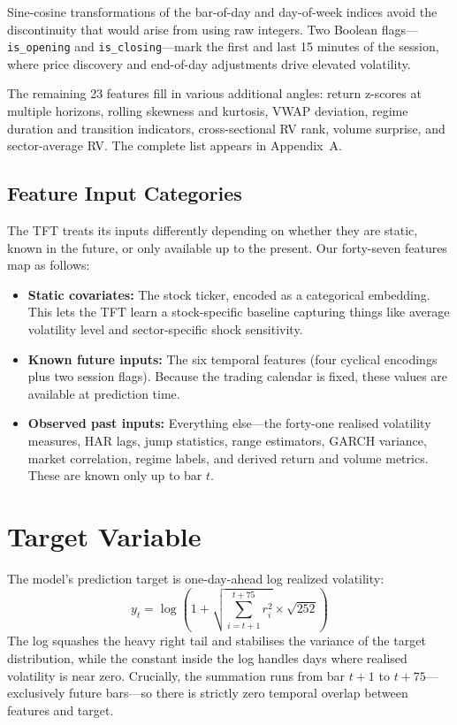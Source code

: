 Sine-cosine transformations of the bar-of-day and day-of-week indices avoid the discontinuity that would arise from using raw integers. Two Boolean flags---\texttt{is\_opening} and \texttt{is\_closing}---mark the first and last 15 minutes of the session, where price discovery and end-of-day adjustments drive elevated volatility.

The remaining 23 features fill in various additional angles: return z-scores at multiple horizons, rolling skewness and kurtosis, VWAP deviation, regime duration and transition indicators, cross-sectional RV rank, volume surprise, and sector-average RV. The complete list appears in Appendix~A.

\subsection{Feature Input Categories}

The TFT treats its inputs differently depending on whether they are static, known in the future, or only available up to the present. Our forty-seven features map as follows:
\begin{itemize}
\item \textbf{Static covariates:} The stock ticker, encoded as a categorical embedding. This lets the TFT learn a stock-specific baseline capturing things like average volatility level and sector-specific shock sensitivity.
\item \textbf{Known future inputs:} The six temporal features (four cyclical encodings plus two session flags). Because the trading calendar is fixed, these values are available at prediction time.
\item \textbf{Observed past inputs:} Everything else---the forty-one realised volatility measures, HAR lags, jump statistics, range estimators, GARCH variance, market correlation, regime labels, and derived return and volume metrics. These are known only up to bar $t$.
\end{itemize}

\section{Target Variable}

The model's prediction target is one-day-ahead log realized volatility:
\begin{equation}
y_t = \log\!\left(1 + \sqrt{\sum_{i=t+1}^{t+75} r_i^2} \times \sqrt{252}\right)
\end{equation}
The log squashes the heavy right tail and stabilises the variance of the target distribution, while the constant inside the log handles days where realised volatility is near zero. Crucially, the summation runs from bar $t+1$ to $t+75$---exclusively future bars---so there is strictly zero temporal overlap between features and target.

